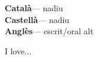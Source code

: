 \documentclass[9pt]{developercv} %
\begin{document}
\begin{minipage}[t]{0.25\textwidth}
  \vspace{-\baselineskip} %

  
  \textbf{Català}\hspace{1.75em}--- nadiu\\
  \textbf{Castellà}\hspace{1em}--- nadiu\\
  \textbf{Anglès}\hspace{1.6em}--- escrit/oral alt
\end{minipage}
\hfill
\begin{minipage}[t]{0.7\textwidth}
  \vspace{-\baselineskip} %
  
  
  I love... \lorem\lorem\lorem\lorem\\ \lorem\lorem
\end{minipage}
  
  

\end{document}
